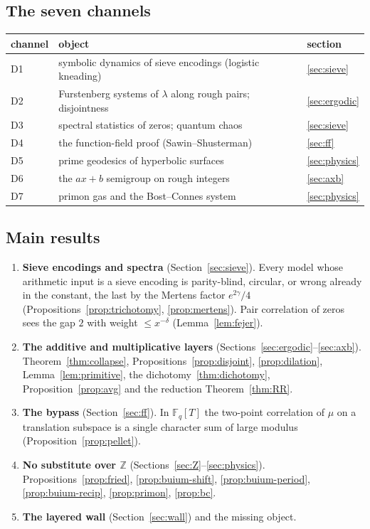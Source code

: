 \documentclass[11pt]{amsart}
\theoremstyle{definition}
\theoremstyle{remark}
\newcommand{\Z}{\mathbb{Z}}
\newcommand{\F}{\mathbb{F}}
\begin{document}
\subsection{The seven channels}
\begin{center}\small
\begin{tabular}{lll}
\toprule
channel & object & section\\
\midrule
D1 & symbolic dynamics of sieve encodings (logistic kneading) & \ref{sec:sieve}\\
D2 & Furstenberg systems of $\lambda$ along rough pairs; disjointness & \ref{sec:ergodic}\\
D3 & spectral statistics of zeros; quantum chaos & \ref{sec:sieve}\\
D4 & the function-field proof (Sawin--Shusterman) & \ref{sec:ff}\\
D5 & prime geodesics of hyperbolic surfaces & \ref{sec:physics}\\
D6 & the $ax+b$ semigroup on rough integers & \ref{sec:axb}\\
D7 & primon gas and the Bost--Connes system & \ref{sec:physics}\\
\bottomrule
\end{tabular}
\end{center}

\subsection{Main results}
\begin{enumerate}
\item \textbf{Sieve encodings and spectra} (Section~\ref{sec:sieve}). Every model whose arithmetic input is a sieve encoding is parity-blind, circular, or wrong already in the constant, the last by the Mertens factor $e^{2\gamma}/4$ (Propositions~\ref{prop:trichotomy}, \ref{prop:mertens}). Pair correlation of zeros sees the gap $2$ with weight $\le x^{-\delta}$ (Lemma~\ref{lem:fejer}).
\item \textbf{The additive and multiplicative layers} (Sections~\ref{sec:ergodic}--\ref{sec:axb}). Theorem~\ref{thm:collapse}, Propositions~\ref{prop:disjoint}, \ref{prop:dilation}, Lemma~\ref{lem:primitive}, the dichotomy~\ref{thm:dichotomy}, Proposition~\ref{prop:avg} and the reduction Theorem~\ref{thm:RR}.
\item \textbf{The bypass} (Section~\ref{sec:ff}). In $\F_q[T]$ the two-point correlation of $\mu$ on a translation subspace is a single character sum of large modulus (Proposition~\ref{prop:pellet}).
\item \textbf{No substitute over $\Z$} (Sections~\ref{sec:Z}--\ref{sec:physics}). Propositions~\ref{prop:fried}, \ref{prop:buium-shift}, \ref{prop:buium-period}, \ref{prop:buium-recip}, \ref{prop:primon}, \ref{prop:bc}.
\item \textbf{The layered wall} (Section~\ref{sec:wall}) and the missing object.
\end{enumerate}
\end{document}
